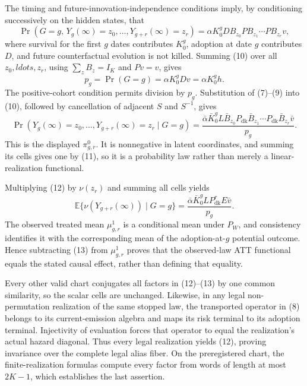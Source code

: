 The timing and future-innovation-independence conditions imply, by conditioning successively on the hidden states, that
\[
 \Pr\!\left(G=g,\,Y_g(\infty)=z_0,\ldots,Y_{g+r}(\infty)=z_r\right)
 =\alpha K_0^gDB_{z_0}PB_{z_1}\cdots PB_{z_r}v,               \tag{10}
\]
where survival for the first \(g\) dates contributes \(K_0^g\), adoption at date \(g\) contributes \(D\), and future counterfactual evolution is not killed.  Summing (10) over all \(z_0,ldots,z_r\), using \(\sum_zB_z=I_K\) and \(Pv=v\), gives
\[
 p_g=\Pr(G=g)=\alpha K_0^gDv=\alpha K_0^gh.                  \tag{11}
\]
The positive-cohort condition permits division by \(p_g\).  Substitution of (7)--(9) into (10), followed by cancellation of adjacent \(S\) and \(S^{-1}\), gives
\[
 \Pr\!\left(Y_g(\infty)=z_0,\ldots,Y_{g+r}(\infty)=z_r\mid G=g\right)
 =\frac{\bar\alpha\bar K_0^gL\bar B_{z_0}P_{\mathrm{dk}}\bar B_{z_1}\cdots P_{\mathrm{dk}}\bar B_{z_r}\bar v}{p_g}. \tag{12}
\]
This is the displayed \(\pi^0_{g,r}\).  It is nonnegative in latent coordinates, and summing its cells gives one by (11), so it is a probability law rather than merely a linear-realization functional.

Multiplying (12) by \(\nu(z_r)\) and summing all cells yields
\[
 \mathbb E\{\nu(Y_{g+r}(\infty))\mid G=g\}
 =\frac{\bar\alpha\bar K_0^gLP_{\mathrm{dk}}^rE\bar v}{p_g}.
                                                                    \tag{13}
\]
The observed treated mean \(\mu^1_{g,r}\) is a conditional mean under \(P_W\), and consistency identifies it with the corresponding mean of the adoption-at-\(g\) potential outcome.  Hence subtracting (13) from \(\mu^1_{g,r}\) proves that the observed-law ATT functional equals the stated causal effect, rather than defining that equality.

Every other valid chart conjugates all factors in (12)--(13) by one common similarity, so the scalar cells are unchanged.  Likewise, in any legal non-permutation realization of the same stopped law, the transported operator in (8) belongs to its current-emission algebra and maps its risk terminal to its adoption terminal.  Injectivity of evaluation forces that operator to equal the realization's actual hazard diagonal.  Thus every legal realization yields (12), proving invariance over the complete legal alias fiber.  On the preregistered chart, the finite-realization formulas compute every factor from words of length at most \(2K-1\), which establishes the last assertion.

